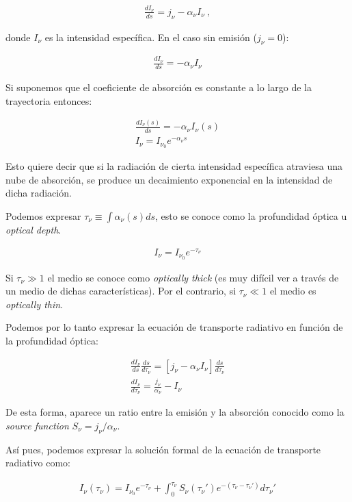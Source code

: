 \documentclass{tufte-handout}
\begin{document}
\begin{align}
\frac{dI_\nu}{ds} = j_\nu - \alpha_\nu I_\nu~,
\end{align}

donde $I_\nu$ es la intensidad específica. En el caso sin emisión ($j_\nu = 0$):

\begin{align}
  \frac{dI_\nu}{ds} = - \alpha_\nu I_\nu
\end{align}

Si suponemos que el coeficiente de absorción es constante a lo largo de la trayectoria entonces:

\begin{align}
  \frac{dI_\nu(s)}{ds} = - \alpha_\nu I_\nu(s)\\
  I_\nu = I_{\nu_0} e^{- \alpha_\nu s}
\end{align}

Esto quiere decir que si la radiación de cierta intensidad específica atraviesa una nube de absorción, se produce un decaimiento exponencial en la intensidad de dicha radiación.

Podemos expresar $\tau_\nu \equiv \int \alpha_\nu(s) ds$, esto se conoce como la profundidad óptica u \emph{optical depth}.

\begin{align}
  I_\nu = I_{\nu_0} e^{-\tau_\nu}
\end{align}

Si $\tau_\nu \gg 1$ el medio se conoce como \emph{optically thick} (es muy difícil ver a través de un medio de dichas características). Por el contrario, si $\tau_\nu \ll 1$ el medio es \emph{optically thin}.

Podemos por lo tanto expresar la ecuación de transporte radiativo en función de la profundidad óptica:

\begin{align}
  \frac{dI_\nu}{ds}\frac{ds}{d\tau_\nu} = [j_\nu - \alpha_\nu I_\nu]\frac{ds}{d\tau_\nu}\\
  \frac{dI_\nu}{d\tau_\nu} = \frac{j_\nu}{\alpha_\nu} - I_\nu
\end{align}

De esta forma, aparece un ratio entre la emisión y la absorción conocido como la \emph{source function} $ S_\nu = j_\nu / \alpha_\nu$.

Así pues, podemos expresar la solución formal de la ecuación de transporte radiativo como:

\begin{align}
I_\nu(\tau_\nu) = I_{\nu_0}e^{-\tau_\nu} + \int_0^{\tau_\nu} S_\nu(\tau_\nu')e^{-(\tau_\nu - \tau_\nu')}d\tau_\nu'
\end{align}
\end{document}
